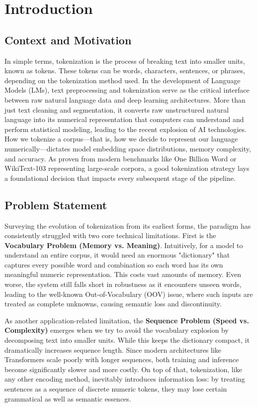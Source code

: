 \section{Introduction}

\subsection{Context and Motivation}
In simple terms, tokenization is the process of breaking text into smaller units, known as tokens. These tokens can be words, characters, sentences, or phrases, depending on the tokenization method used. In the development of Language Models (LMs), text preprocessing and tokenization serve as the critical interface between raw natural language data and deep learning architectures. More than just text cleaning and segmentation, it converts raw unstructured natural language into its numerical representation that computers can understand and perform statistical modeling, leading to the recent explosion of AI technologies. How we tokenize a corpus—that is, how we decide to represent our language numerically—dictates model embedding space distributions, memory complexity, and accuracy. As proven from modern benchmarks like One Billion Word or WikiText-103 representing large-scale corpora, a good tokenization strategy lays a foundational decision that impacts every subsequent stage of the pipeline.

\subsection{Problem Statement}
\label{token_probs}
Surveying the evolution of tokenization from its earliest forms, the paradigm has consistently struggled with two core technical limitations. First is the \textbf{Vocabulary Problem (Memory vs. Meaning)}. Intuitively, for a model to understand an entire corpus, it would need an enormous "dictionary" that captures every possible word and combination so each word has its own meaningful numeric representation. This costs vast amounts of memory. Even worse, the system still falls short in robustness as it encounters unseen words, leading to the well-known Out-of-Vocabulary (OOV) issue, where such inputs are treated as complete unknowns, causing semantic loss and discontinuity.

As another application-related limitation, the \textbf{Sequence Problem (Speed vs. Complexity)} emerges when we try to avoid the vocabulary explosion by decomposing text into smaller units. While this keeps the dictionary compact, it dramatically increases sequence length. Since modern architectures like Transformers scale poorly with longer sequences, both training and inference become significantly slower and more costly. On top of that, tokenization, like any other encoding method, inevitably introduces information loss: by treating sentences as a sequence of discrete numeric tokens, they may lose certain grammatical as well as semantic essences. 

